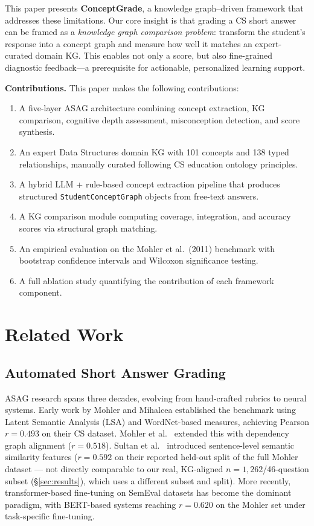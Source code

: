 \documentclass[conference]{IEEEtran}
\begin{document}
This paper presents \textbf{ConceptGrade}, a knowledge graph–driven framework that
addresses these limitations. Our core insight is that grading a CS short answer can
be framed as a \emph{knowledge graph comparison problem}: transform the student's
response into a concept graph and measure how well it matches an expert-curated
domain KG. This enables not only a score, but also fine-grained diagnostic
feedback—a prerequisite for actionable, personalized learning support.

\textbf{Contributions.} This paper makes the following contributions:
\begin{enumerate}
  \item A five-layer ASAG architecture combining concept extraction, KG comparison,
        cognitive depth assessment, misconception detection, and score synthesis.
  \item An expert Data Structures domain KG with 101 concepts and 138 typed
        relationships, manually curated following CS education ontology principles.
  \item A hybrid LLM + rule-based concept extraction pipeline that produces
        structured \texttt{StudentConceptGraph} objects from free-text answers.
  \item A KG comparison module computing coverage, integration, and accuracy scores
        via structural graph matching.
  \item An empirical evaluation on the Mohler et al.\ (2011) benchmark with
        bootstrap confidence intervals and Wilcoxon significance testing.
  \item A full ablation study quantifying the contribution of each framework component.
\end{enumerate}

\section{Related Work}

\subsection{Automated Short Answer Grading}

ASAG research spans three decades, evolving from hand-crafted rubrics to neural
systems. Early work by Mohler and Mihalcea \cite{mohler2009} established the
benchmark using Latent Semantic Analysis (LSA) and WordNet-based measures,
achieving Pearson \(r = 0.493\) on their CS dataset. Mohler et al.\
\cite{mohler2011} extended this with dependency graph alignment (\(r = 0.518\)).
Sultan et al.\ \cite{sultan2016} introduced sentence-level semantic similarity
features (\(r = 0.592\) on their reported held-out split of the full Mohler
dataset --- not directly comparable to our real, KG-aligned $n=1{,}262$/46-question
subset (\S\ref{sec:results}), which uses a different subset and split).
More recently, transformer-based
fine-tuning on SemEval datasets \cite{semeval2013} has become the dominant
paradigm, with BERT-based systems reaching \(r = 0.620\) on the Mohler set
under task-specific fine-tuning.
\end{document}

